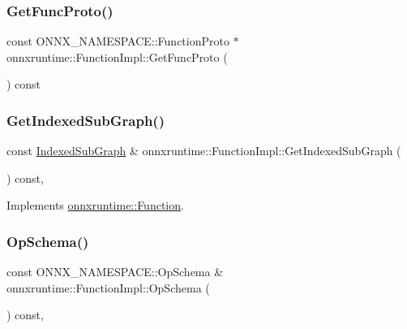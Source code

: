 \subsubsection{\texorpdfstring{Get\+Func\+Proto()}{GetFuncProto()}}
{\footnotesize\ttfamily const O\+N\+N\+X\+\_\+\+N\+A\+M\+E\+S\+P\+A\+C\+E\+::\+Function\+Proto $\ast$ onnxruntime\+::\+Function\+Impl\+::\+Get\+Func\+Proto (\begin{DoxyParamCaption}{ }\end{DoxyParamCaption}) const}

\mbox{\label{classonnxruntime_1_1FunctionImpl_a97e5a25ac521423dbe59501f6b7fd2c1}} 
\subsubsection{\texorpdfstring{Get\+Indexed\+Sub\+Graph()}{GetIndexedSubGraph()}}
{\footnotesize\ttfamily const \mbox{\hyperlink{structonnxruntime_1_1IndexedSubGraph}{Indexed\+Sub\+Graph}} \& onnxruntime\+::\+Function\+Impl\+::\+Get\+Indexed\+Sub\+Graph (\begin{DoxyParamCaption}{ }\end{DoxyParamCaption}) const\hspace{0.3cm}{\ttfamily [override]}, {\ttfamily [virtual]}}



Implements \mbox{\hyperlink{classonnxruntime_1_1Function_a017f5155e74c32b1e3cd42e6c0f94d91}{onnxruntime\+::\+Function}}.

\mbox{\label{classonnxruntime_1_1FunctionImpl_ad003c6cab0d96bd8cd96d2bb5abfce50}} 
\subsubsection{\texorpdfstring{Op\+Schema()}{OpSchema()}}
{\footnotesize\ttfamily const O\+N\+N\+X\+\_\+\+N\+A\+M\+E\+S\+P\+A\+C\+E\+::\+Op\+Schema \& onnxruntime\+::\+Function\+Impl\+::\+Op\+Schema (\begin{DoxyParamCaption}{ }\end{DoxyParamCaption}) const\hspace{0.3cm}{\ttfamily [override]}, {\ttfamily [virtual]}}



